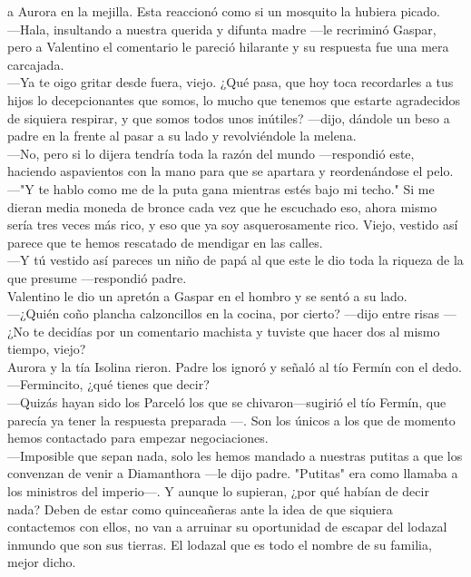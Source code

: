 \documentclass[
  letterpaper,
]{book}
\begin{document}
a Aurora en la mejilla. Esta reaccionó como si un mosquito la hubiera
picado.\\
---Hala, insultando a nuestra querida y difunta madre ---le recriminó
Gaspar, pero a Valentino el comentario le pareció hilarante y su
respuesta fue una mera carcajada.\\
---Ya te oigo gritar desde fuera, viejo. ¿Qué pasa, que hoy toca
recordarles a tus hijos lo decepcionantes que somos, lo mucho que
tenemos que estarte agradecidos de siquiera respirar, y que somos todos
unos inútiles? ---dijo, dándole un beso a padre en la frente al pasar a
su lado y revolviéndole la melena.\\
---No, pero si lo dijera tendría toda la razón del mundo ---respondió
este, haciendo aspavientos con la mano para que se apartara y
reordenándose el pelo. ~\\
---"Y te hablo como me de la puta gana mientras estés bajo mi techo." Si
me dieran media moneda de bronce cada vez que he escuchado eso, ahora
mismo sería tres veces más rico, y eso que ya soy asquerosamente rico.
Viejo, vestido así parece que te hemos rescatado de mendigar en las
calles.\\
---Y tú vestido así pareces un niño de papá al que este le dio toda la
riqueza de la que presume ---respondió padre.\\
Valentino le dio un apretón a Gaspar en el hombro y se sentó a su
lado.\\
---¿Quién coño plancha calzoncillos en la cocina, por cierto? ---dijo
entre risas --- ¿No te decidías por un comentario machista y tuviste que
hacer dos al mismo tiempo, viejo?\\
Aurora y la tía Isolina rieron. Padre los ignoró y señaló al tío Fermín
con el dedo.\\
---Fermincito, ¿qué tienes que decir?\\
---Quizás hayan sido los Parceló los que se chivaron---sugirió el tío
Fermín, que parecía ya tener la respuesta preparada ---. Son los únicos
a los que de momento hemos contactado para empezar negociaciones.\\
---Imposible que sepan nada, solo les hemos mandado a nuestras putitas a
que los convenzan de venir a Diamanthora ---le dijo padre. "Putitas" era
como llamaba a los ministros del imperio---. Y aunque lo supieran, ¿por
qué habían de decir nada? Deben de estar como quinceañeras ante la idea
de que siquiera contactemos con ellos, no van a arruinar su oportunidad
de escapar del lodazal inmundo que son sus tierras. El lodazal que es
todo el nombre de su familia, mejor dicho.\\
\end{document}
